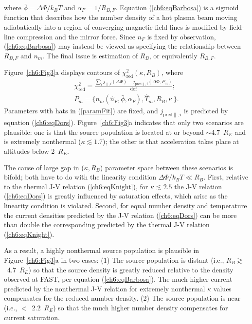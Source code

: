   where $\bar{\phi} = \Delta \Phi / k_B T $ and $\alpha_F = 1 /
  R_{B,F}$. Equation (\ref{ch6:eqBarbosa}) is a sigmoid function
  \citep[Figure 1b][]{Barbosa1977} that describes how the number
  density of a hot plasma beam moving adiabatically into a region of
  converging magnetic field lines is modified by field-line
  compression and the mirror force. Since $n_F$ is fixed by
  observation, (\ref{ch6:eqBarbosa}) may instead be viewed as specifying
  the relationship between $R_{B,F}$ and $n_m$. The final issue is
  estimation of $R_B$, or equivalently $R_{B,F}$.

  Figure~\ref{ch6:Fig3}a displays contours of $\chi^2_{\textrm{red}} (
  \kappa, R_B )$, where
  \begin{subequations}
    \begin{align} \chi^2_{\mathrm{red}} = \frac{\sum_i j_{\parallel,i} (\Delta \Phi) - j_{\textrm{pred}\parallel,i}(\Delta \Phi; P_m)}{\mathrm{dof}}; \\
      P_m = \Big \{ n_m ( \hat{n}_F, \bar{\phi} , \alpha_F ),
      \hat{T}_m, R_B, \kappa \, \Big \}. \label{paramFit}
    \end{align}
  \end{subequations}
  Parameters with hats in (\ref{paramFit}) are fixed, and
  $j_{\textrm{pred}\parallel,i} $ is predicted by equation
  (\ref{ch6:eqDors}). Figure~\ref{ch6:Fig3}a indicates that only two scenarios
  are plausible: one is that the source population is located at or
  beyond $\sim$4.7~$R_E$ and is extremely nonthermal ($\kappa \lesssim
  1.7$); the other is that acceleration takes place at altitudes below
  2~$R_E$. 

  The cause of large gap in ($\kappa, R_B$) parameter space between
  these scenarios is bifold; both have to do with the linearity
  condition $\Delta \Phi / k_B T \ll R_B $. First, relative to the
  thermal J-V relation (\ref{ch6:eqKnight}), for $\kappa \lesssim 2.5$ the
  J-V relation (\ref{ch6:eqDors}) is greatly influenced by saturation
  effects, which arise as the linearity condition is violated. Second,
  for equal number density and temperature the current densities predicted by
  the J-V relation (\ref{ch6:eqDors}) can be more than double the
  corresponding predicted by the thermal J-V relation
  (\ref{ch6:eqKnight}). 

  As a result, a highly nonthermal source population is plausible in
  Figure~\ref{ch6:Fig3}a in two cases: (1) The source population is
  distant (i.e., $R_B \gtrsim$~4.7~$R_E$) so that the source density
  is greatly reduced relative to the density observed at FAST, per
  equation (\ref{ch6:eqBarbosa}). The much higher current predicted by the
  nonthermal J-V relation for extremely nonthermal $\kappa$ values
  compensates for the reduced number density. (2) The source
  population is near (i.e., $<$~2.2~$R_E$) so that the much higher
  number density compensates for current saturation.

